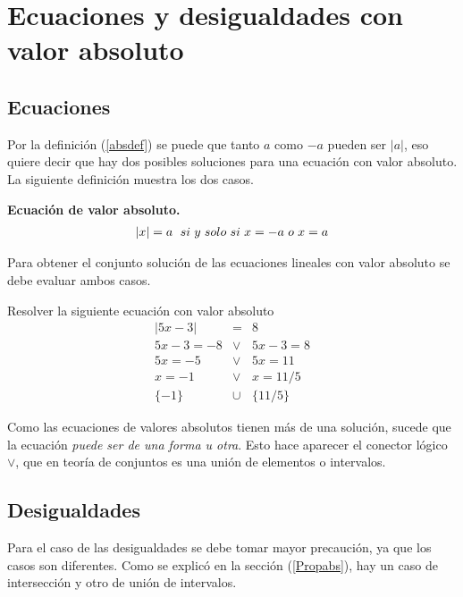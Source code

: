\section{Ecuaciones y desigualdades con valor absoluto}
\subsection{Ecuaciones}
Por la definición (\ref{absdef}) se puede que tanto $a$ como $-a$ pueden ser $|a|$, eso quiere decir que hay dos posibles soluciones para una ecuación con valor absoluto. La siguiente definición muestra los dos casos.
\begin{mydef}
\textbf{Ecuación de valor absoluto.}
\begin{eqnarray*}
|x|=a\hspace{6px} si\hspace{3px}y\hspace{3px}solo\hspace{3px}si\hspace{3px}x=-a\hspace{3px}o\hspace{3px}x=a
\end{eqnarray*}
\end{mydef}
Para obtener el conjunto solución de las ecuaciones lineales con valor absoluto se debe evaluar ambos casos.

\begin{myexample}
Resolver la siguiente ecuación con valor absoluto
\begin{eqnarray*}
|5x-3|&=&8\\
5x-3=-8 &\vee & 5x-3=8\\
5x=-5 &\vee & 5x=11\\
x=-1 &\vee & x=11/5\\
\{-1\} &\cup & \{11/5\}
\end{eqnarray*}
\end{myexample}
Como las ecuaciones de valores absolutos tienen más de una solución, sucede que la ecuación \textit{puede ser de una forma u otra}. Esto hace aparecer el conector lógico $\vee$, que en teoría de conjuntos es una unión de elementos o intervalos.\\

\subsection{Desigualdades}

Para el caso de las desigualdades se debe tomar mayor precaución, ya que los casos son diferentes. Como se explicó en la sección (\ref{Propabs}), hay un caso de intersección y otro de unión de intervalos.\\

